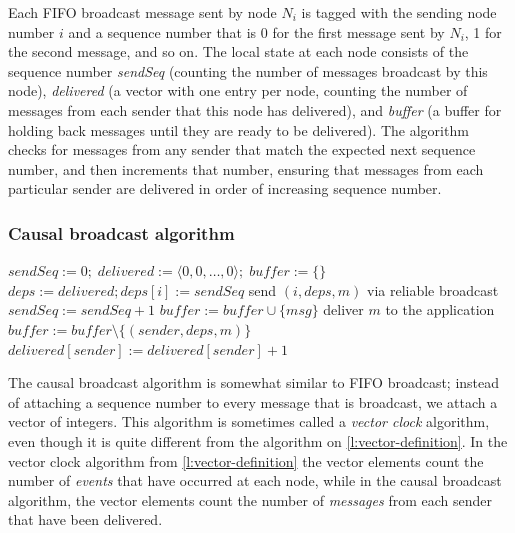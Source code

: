 Each FIFO broadcast message sent by node $N_i$ is tagged with the sending node number $i$ and a sequence number that is 0 for the first message sent by $N_i$, 1 for the second message, and so on.
The local state at each node consists of the sequence number \emph{sendSeq} (counting the number of messages broadcast by this node), \emph{delivered} (a vector with one entry per node, counting the number of messages from each sender that this node has delivered), and \emph{buffer} (a buffer for holding back messages until they are ready to be delivered).
The algorithm checks for messages from any sender that match the expected next sequence number, and then increments that number, ensuring that messages from each particular sender are delivered in order of increasing sequence number.

\begin{frame}
    \label{s:causal-algorithm}
    \frametitle{Causal broadcast algorithm}
    \footnotesize
    \begin{algorithmic}
            \State $\mathit{sendSeq} := 0;\; \mathit{delivered} := \langle 0, 0, \dots, 0 \rangle;\; \mathit{buffer} := \{\}$
        \EndOn
        \State
            \State $\mathit{deps} := \mathit{delivered}; \mathit{deps}[i] := sendSeq$
            \State send $(i, \mathit{deps}, m)$ via reliable broadcast
            \State $\mathit{sendSeq} := \mathit{sendSeq} + 1$
        \EndOn
        \State
            \State $\mathit{buffer} := \mathit{buffer} \cup \{\mathit{msg}\}$
                \State deliver $m$ to the application
                \State $\mathit{buffer} := \mathit{buffer} \setminus \{(\mathit{sender}, \mathit{deps}, m)\}$
                \State $\mathit{delivered}[\mathit{sender}] := \mathit{delivered}[\mathit{sender}] + 1$
            \EndWhile
        \EndOn
    \end{algorithmic}
\end{frame}
\label{l:causal-algorithm}


The causal broadcast algorithm is somewhat similar to FIFO broadcast; instead of attaching a sequence number to every message that is broadcast, we attach a vector of integers.
This algorithm is sometimes called a \emph{vector clock} algorithm, even though it is quite different from the algorithm on \autoref{l:vector-definition}.
In the vector clock algorithm from \autoref{l:vector-definition} the vector elements count the number of \emph{events} that have occurred at each node, while in the causal broadcast algorithm, the vector elements count the number of \emph{messages} from each sender that have been delivered.

